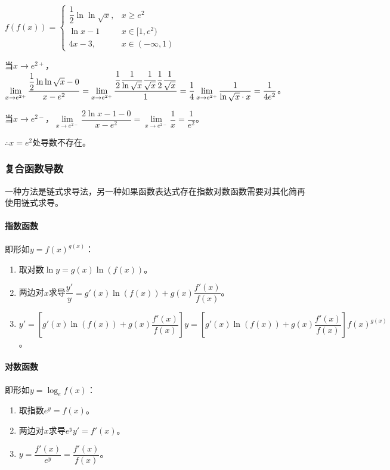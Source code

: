 $f(f(x))=\left\{\begin{array}{ll}
    \dfrac{1}{2}\ln\ln\sqrt{x}, & x\geqslant e^2  \\
    \ln x-1 & x\in[1,e^2) \\
    4x-3, & x\in(-\infty,1)
\end{array}\right.$

当$x\to e^{2+}$，$\lim\limits_{x\to e^{2+}}\dfrac{\dfrac{1}{2}\ln\ln\sqrt{x}-0}{x-e^2}=\lim\limits_{x\to e^{2+}}\dfrac{\dfrac{1}{2}\dfrac{1}{\ln\sqrt{x}}\dfrac{1}{\sqrt{x}}\dfrac{1}{2}\dfrac{1}{\sqrt{x}}}{1}=\\\dfrac{1}{4}\lim\limits_{x\to e^{2+}}\dfrac{1}{\ln\sqrt{x}\cdot x}=\dfrac{1}{4e^2}$。

当$x\to e^{2-}$，$\lim\limits_{x\to e^{2-}}\dfrac{2\ln x-1-0}{x-e^2}=\lim\limits_{x\to e^{2-}}\dfrac{1}{x}=\dfrac{1}{e^2}$。

$\therefore x=e^2$处导数不存在。

\subsubsection{复合函数导数}

一种方法是链式求导法，另一种如果函数表达式存在指数对数函数需要对其化简再使用链式求导。

\paragraph{指数函数} \leavevmode \medskip

即形如$y=f(x)^{g(x)}$：

\begin{enumerate}
    \item 取对数$\ln y =g(x)\ln(f(x))$。
    \item 两边对$x$求导$\dfrac{y'}{y}=g'(x)\ln(f(x))+g(x)\dfrac{f'(x)}{f(x)}$。
    \item $y'=[g'(x)\ln(f(x))+g(x)\dfrac{f'(x)}{f(x)}]y=[g'(x)\ln(f(x))+g(x)\dfrac{f'(x)}{f(x)}]f(x)^{g(x)}$。
\end{enumerate}

\paragraph{对数函数} \leavevmode \medskip

即形如$y=\log_{e}f(x)$：

\begin{enumerate}
    \item 取指数$e^y=f(x)$。
    \item 两边对$x$求导$e^yy'=f'(x)$。
    \item $y=\dfrac{f'(x)}{e^y}=\dfrac{f'(x)}{f(x)}$。
\end{enumerate}

